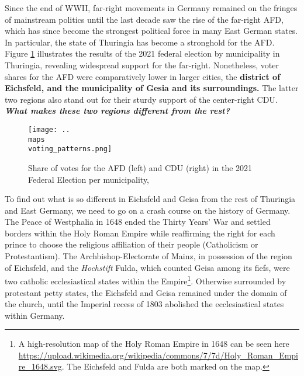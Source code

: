 



\maketitle



Since the end of \ac{WWII}, far-right movements in Germany remained on the fringes of mainstream politics until the last decade saw the rise of the far-right \ac{AFD}, which has since become the strongest political force in many East German states. In particular, the state of Thuringia has become a stronghold for the \ac{AFD}.  Figure \ref{fig:vote_thur} illustrates the results of the 2021 federal election by municipality in Thuringia, revealing widespread support for the far-right. Nonetheless, voter shares for the \ac{AFD} were comparatively lower in larger cities, the \textbf{district of Eichsfeld, and the municipality of Gesia and its surroundings.} The latter two regions also stand out for their sturdy support of the center-right \ac{CDU}. \textit{\textbf{What makes these two regions different from the rest?}}

\begin{figure}[bt]
    \centering
    \caption{Share of votes for the \acs{AFD} (left) and \acs{CDU} (right) in the 2021 Federal Election per municipality, \citep{thueringen_statistics}}
    \texttt{[image: ..\\maps\\voting\_patterns.png]}
    \label{fig:vote_thur}
\end{figure}

\newpage

To find out what is so different in Eichsfeld and Geisa from the rest of Thuringia and East Germany, we need to go on a crash course on the history of Germany. The Peace of Westphalia in 1648 ended the Thirty Years' War and settled borders within the Holy Roman Empire while reaffirming the right for each prince to choose the religious affiliation of their people (Catholicism or Protestantism). The Archbishop-Electorate of Mainz, in possession of the region of Eichsfeld, and the \textit{Hochstift} Fulda, which counted Geisa among its fiefs,  were two catholic ecclesiastical states within the Empire\footnote{A high-resolution map of the Holy Roman Empire in 1648 can be seen here \url{https://upload.wikimedia.org/wikipedia/commons/7/7d/Holy_Roman_Empire_1648.svg}. The Eichsfeld and Fulda are both marked on the map.}. Otherwise surrounded by protestant petty states, the Eichsfeld and Geisa remained under the domain of the church, until the Imperial recess of 1803 abolished the ecclesiastical states within Germany.

